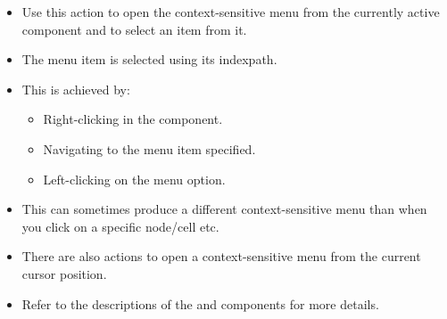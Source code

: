 \begin{itemize}
\item Use this action to open the context-sensitive menu from the currently active component and to select an item from it.
\item The menu item is selected using its indexpath. 
\item This is achieved by:
\begin{itemize}
\item Right-clicking in the component.
\item Navigating to the menu item specified.
\item Left-clicking on the menu option.  
\end{itemize}
\item This can sometimes produce a different context-sensitive menu than when you click on a specific node/cell etc.
\item There are also actions to open a context-sensitive menu from the current cursor position. 
\item Refer to the descriptions of the  and  components for more details. 

\end{itemize}

  